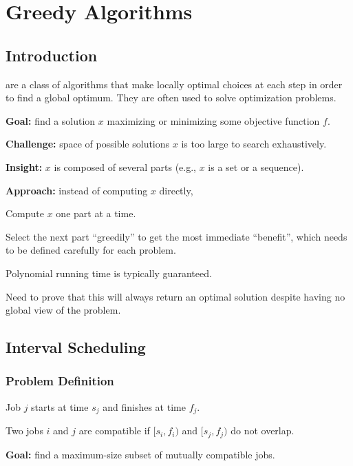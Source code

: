 \chapter{Greedy Algorithms}

\section{Introduction}

 are a class of algorithms that make locally optimal choices at each step in order to find a global optimum. They are often used to solve optimization problems.

\begin{listu}
    \item \textbf{Goal:} find a solution $x$ maximizing or minimizing some objective function $f$.
    \item \textbf{Challenge:} space of possible solutions $x$ is too large to search exhaustively.
    \item \textbf{Insight:} $x$ is composed of several parts (e.g., $x$ is a set or a sequence).
    \item \textbf{Approach:} instead of computing $x$ directly,
    \begin{listu}
        \item Compute $x$ one part at a time.
        \item Select the next part ``greedily'' to get the most immediate ``benefit'', which needs to be defined carefully for each problem.
        \item Polynomial running time is typically guaranteed.
        \item Need to prove that this will always return an optimal solution despite having no global view of the problem.
    \end{listu}
\end{listu}

\section{Interval Scheduling}

\subsection{Problem Definition}

\begin{listu}
    \item Job $j$ starts at time $s_j$ and finishes at time $f_j$.
    \item Two jobs $i$ and $j$ are compatible if $[s_i, f_i)$ and $[s_j, f_j)$ do not overlap.
    \item \textbf{Goal:} find a maximum-size subset of mutually compatible jobs.
\end{listu}

